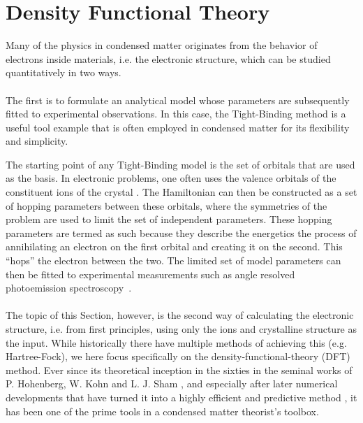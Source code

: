 \chapter{Density Functional Theory \label{ch:DFT}}
Many of the physics in condensed matter originates from the behavior of electrons inside materials, i.e. the electronic structure, which can be studied quantitatively in two ways.
\\\\
The first is to formulate an analytical model whose parameters are subsequently fitted to experimental observations. 
In this case, the Tight-Binding method is a useful tool example that is often employed in condensed matter for its flexibility and simplicity.

The starting point of any Tight-Binding model is the set of orbitals that are used as the basis.
In electronic problems, one often uses the valence orbitals of the constituent ions of the crystal \cite{Bloch1929,Slater1954}.
The Hamiltonian can then be constructed as a set of hopping parameters between these orbitals, where the symmetries of the problem are used to limit the set of independent parameters.
These hopping parameters are termed as such because they describe the energetics the process of annihilating an electron on the first orbital and creating it on the second.
This ``hops'' the electron between the two.
The limited set of model parameters can then be fitted to experimental measurements such as angle resolved photoemission spectroscopy~\cite{Damascelli2004}.
\\\\
The topic of this Section, however, is the second way of calculating the electronic structure, i.e. from first principles, using only the ions and crystalline structure as the input. 
While historically there have multiple methods of achieving this (e.g. Hartree-Fock), we here focus specifically on the density-functional-theory (DFT) method.
Ever since its theoretical inception in the sixties in the seminal works of P. Hohenberg, W. Kohn and L. J. Sham  \cite{Hohenberg1964,Kohn1965}, and especially after later numerical developments that have turned it into a highly efficient and predictive method \cite{Hamann1979,Louie1982,Vanderbilt1990,Joubert1999,Perdew1985,Perdew1986,Perdew1993}, it has been one of the prime tools in a condensed matter theorist's toolbox.

